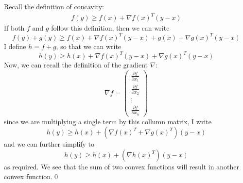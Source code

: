 Recall the definition of concavity:
\begin{align*}
f(y)\geq f(x)+\nabla f(x)^{T}(y-x)
\end{align*}
If both $f$ and $g$ follow this definition, then we can write
\begin{equation*}
  f(y) + g(y) \geq f(x) + \nabla f(x)^{T}(y-x) + g(x) + \nabla g(x)^{T}(y-x)
\end{equation*}
I define $h = f + g$, so that we can write
\begin{equation*}
  h(y) \geq h(x) + \nabla f(x)^{T}(y-x) + \nabla g(x)^{T}(y-x)
\end{equation*}
Now, we can recall the definition of the gradient $\nabla$:
\begin{equation*}
\nabla f =
\begin{pmatrix}
\frac{\partial f}{\partial x_1} \\
\frac{\partial f}{\partial x_2} \\
\vdots \\
\frac{\partial f}{\partial x_n}
\end{pmatrix}
\end{equation*}
since we are multiplying a single term by this collumn matrix, I write
\begin{equation*}
  h(y) \geq h(x) + (\nabla f(x)^{T} + \nabla g(x)^{T})(y-x)
\end{equation*}
and we can further simplify to
\begin{equation*}
  h(y) \geq h(x) + (\nabla h(x)^{T})(y-x)
\end{equation*}
as required. We see that the sum of two convex functions will result in another convex function.\qed

